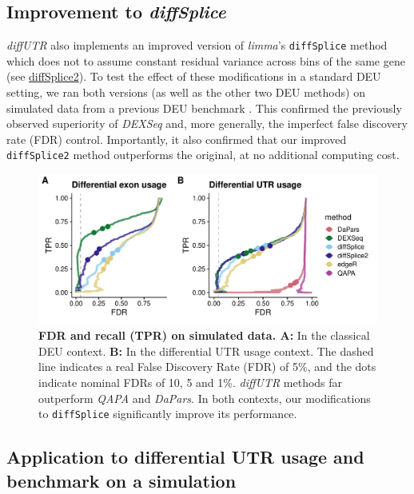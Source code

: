 \documentclass{bmcart}
\begin{document}
\subsection*{Improvement to \textit{diffSplice}}
\textit{diffUTR} also implements an improved version of \textit{limma}'s \texttt{diffSplice} method which does not to assume constant residual variance across bins of the same gene (see \hyperref[sec:diffSplice2]{diffSplice2}). To test the effect of these modifications in a standard DEU setting, we ran both versions (as well as the other two DEU methods) on simulated data from a previous DEU benchmark \cite{Soneson2016IsoformUsage}. This confirmed the previously observed superiority of \textit{DEXSeq} and, more generally, the imperfect false discovery rate (FDR) control. Importantly, it also confirmed that our improved \texttt{diffSplice2} method outperforms the original, at no additional computing cost.

\begin{figure}[h]
\includegraphics[width=1\textwidth]{figure2.pdf}
\caption{\textbf{FDR and recall (TPR) on simulated data. A:} In the classical DEU context. \textbf{B:} In the differential UTR usage context. The dashed line indicates a real False Discovery Rate (FDR) of 5\%, and the dots indicate nominal FDRs of 10, 5 and 1\%. \textit{diffUTR} methods far outperform \textit{QAPA} and \textit{DaPars}. In both contexts, our modifications to \texttt{diffSplice} significantly improve its performance.}
\label{fig:pr1}
\end{figure}

\subsection*{Application to differential UTR usage and benchmark on a simulation}
\end{document}
